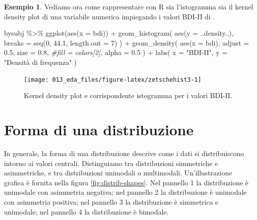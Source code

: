 \documentclass[
  11pt,
  italian,
  a4paper,
  extrafontsizes,onecolumn,openright
  ]{memoir}
\newenvironment{Shaded}{\begin{snugshade}}{\end{snugshade}}
\newcommand{\AttributeTok}[1]{\textcolor[rgb]{0.77,0.63,0.00}{#1}}
\newcommand{\CommentTok}[1]{\textcolor[rgb]{0.56,0.35,0.01}{\textit{#1}}}
\newcommand{\DecValTok}[1]{\textcolor[rgb]{0.00,0.00,0.81}{#1}}
\newcommand{\FloatTok}[1]{\textcolor[rgb]{0.00,0.00,0.81}{#1}}
\newcommand{\FunctionTok}[1]{\textcolor[rgb]{0.00,0.00,0.00}{#1}}
\newcommand{\NormalTok}[1]{#1}
\newcommand{\SpecialCharTok}[1]{\textcolor[rgb]{0.00,0.00,0.00}{#1}}
\newcommand{\StringTok}[1]{\textcolor[rgb]{0.31,0.60,0.02}{#1}}
\theoremstyle{definition}
\theoremstyle{definition}
\newtheorem{example}{Esempio}[chapter]
\theoremstyle{definition}
\theoremstyle{definition}
\theoremstyle{remark}
\begin{document}
\begin{example}

Vediamo ora come rappresentare con R sia l'istogramma sia il kernel density plot di una variabile numerica impiegando i valori BDI-II di \textcite{zetschefuture2019}.

\begin{Shaded}
\begin{Highlighting}[]
\NormalTok{bysubj }\SpecialCharTok{\%\textgreater{}\%} 
  \FunctionTok{ggplot}\NormalTok{(}\FunctionTok{aes}\NormalTok{(}\AttributeTok{x =}\NormalTok{ bdi)) }\SpecialCharTok{+}
  \FunctionTok{geom\_histogram}\NormalTok{(}
    \FunctionTok{aes}\NormalTok{(}\AttributeTok{y =}\NormalTok{ ..density..), }
    \AttributeTok{breaks =} \FunctionTok{seq}\NormalTok{(}\DecValTok{0}\NormalTok{, }\FloatTok{44.1}\NormalTok{, }\AttributeTok{length.out =} \DecValTok{7}\NormalTok{)}
\NormalTok{  ) }\SpecialCharTok{+}
  \FunctionTok{geom\_density}\NormalTok{(}
    \FunctionTok{aes}\NormalTok{(}\AttributeTok{x =}\NormalTok{ bdi), }
    \AttributeTok{adjust =} \FloatTok{0.5}\NormalTok{, }
    \AttributeTok{size =} \FloatTok{0.8}\NormalTok{, }
    \CommentTok{\#fill = colors[2],}
    \AttributeTok{alpha =} \FloatTok{0.5}
\NormalTok{  ) }\SpecialCharTok{+}
  \FunctionTok{labs}\NormalTok{(}
    \AttributeTok{x =} \StringTok{"BDI{-}II"}\NormalTok{,}
    \AttributeTok{y =} \StringTok{"Densità di frequenza"}
\NormalTok{  ) }
\end{Highlighting}
\end{Shaded}

\begin{figure}[h]

{\centering \texttt{[image: 013\_eda\_files/figure-latex/zetschehist3-1]} 

}

\caption{Kernel density plot e corrispondente istogramma per i valori BDI-II.}\label{fig:zetschehist3}
\end{figure}

\end{example}

\hypertarget{forma-di-una-distribuzione}{%
\section{Forma di una distribuzione}\label{forma-di-una-distribuzione}}

In generale, la forma di una distribuzione descrive come i dati si distribuiscono intorno ai valori centrali. Distinguiamo tra distribuzioni simmetriche e asimmetriche, e tra distribuzioni unimodali o multimodali. Un'illustrazione grafica è fornita nella figura \ref{fig:distrib-shapes}. Nel pannello 1 la distribuzione è unimodale con asimmetria negativa; nel pannello 2 la distribuzione è unimodale con asimmetria positiva; nel pannello 3 la distribuzione è simmetrica e unimodale; nel pannello 4 la distribuzione è bimodale.
\end{document}
